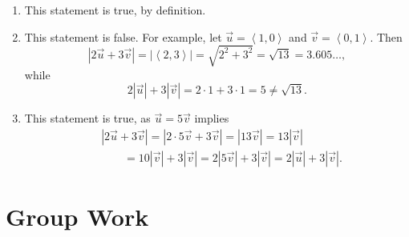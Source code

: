 \documentclass[]{ximera}
\begin{document}
\begin{problem}
\begin{solution}
\begin{enumerate}[label=(\alph*)]
\item This statement is true, by definition.
\item This statement is false. For example, let $\vec{u} = \left<1,0\right>$ and $\vec{v} = \left<0,1\right>$. Then
$$
\left|2\vec{u} + 3 \vec{v}\right| = \left|\left<2,3\right> \right| = \sqrt{2^2 + 3^2} = \sqrt{13} = 3.605\ldots,
$$
while
$$
2 \left|\vec{u}\right| + 3 \left|\vec{v}\right| = 2 \cdot 1 + 3 \cdot 1 = 5 \neq \sqrt{13}.
$$
\item This statement is true, as $\vec{u} = 5 \vec{v}$ implies
\begin{align*}
&\left| 2 \vec{u} + 3 \vec{v}\right| = \left| 2 \cdot 5 \vec{v} + 3 \vec{v}\right| = \left|13 \vec{v}\right| = 13 \left|\vec{v}\right|  \\
& \qquad = 10 \left|\vec{v}\right| + 3 \left|\vec{v} \right| = 2 \left|5\vec{v}\right| + 3 \left|\vec{v} \right| = 2 \left|\vec{u}\right| + 3 \left|\vec{v} \right|.
\end{align*}
\end{enumerate}
\end{solution}
\end{problem}


\section{Group Work}
\end{document}
